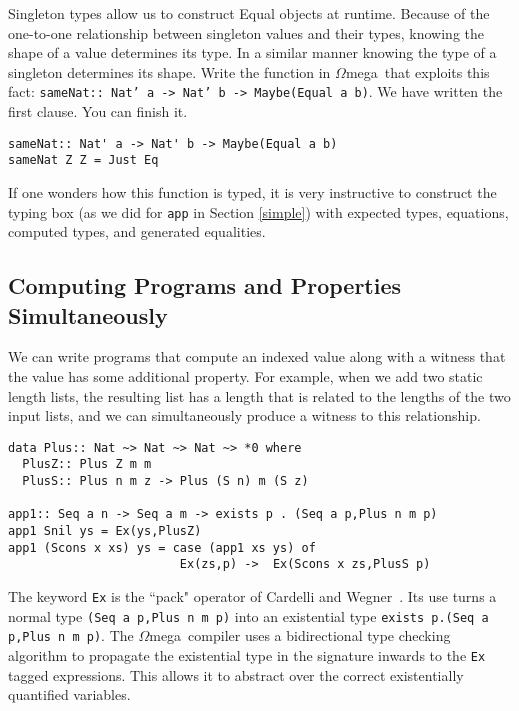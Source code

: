\documentclass[11pt,twoside,A4]{llncs}
\newcommand{\om}{\emph{$\Omega$}mega}
\begin{document}
\begin{exercise} \label{samenat}
Singleton types allow us to construct Equal objects at runtime.
Because of the one-to-one relationship between singleton values and their
types, knowing the shape of a value determines its type. In a similar
manner knowing the type of a singleton determines its shape. Write the
function in \om\ that exploits this fact: {\tt sameNat:: Nat' a -> Nat' b -> Maybe(Equal a b)}.
We have written the first clause. You can finish it.
\begin{verbatim}
sameNat:: Nat' a -> Nat' b -> Maybe(Equal a b)
sameNat Z Z = Just Eq
\end{verbatim}
If one wonders how this function is typed,
it is very instructive to construct the typing box (as we did for
{\tt app} in Section \ref{simple}) with expected types, equations,
computed types, and generated equalities.
\end{exercise}

\subsection{Computing Programs and Properties Simultaneously} We can write
programs that compute an indexed value along with a witness that the
value has some additional property. For example, when we add two
static length lists, the resulting list has a length that is
related to the lengths of the two input lists, and we can
simultaneously produce a witness to this relationship.

{\small
\begin{verbatim}
data Plus:: Nat ~> Nat ~> Nat ~> *0 where
  PlusZ:: Plus Z m m
  PlusS:: Plus n m z -> Plus (S n) m (S z)

app1:: Seq a n -> Seq a m -> exists p . (Seq a p,Plus n m p)
app1 Snil ys = Ex(ys,PlusZ)
app1 (Scons x xs) ys = case (app1 xs ys) of  
                        Ex(zs,p) ->  Ex(Scons x zs,PlusS p) 
\end{verbatim}}\vspace*{-.05in}

\noindent The keyword {\tt Ex} is the ``pack" operator of Cardelli and
Wegner~\cite{Cardelli-Wegner85}. Its use turns a normal type 
{\small \verb+(Seq a p,Plus n m p)+} into an existential type 
{\small \verb+exists p.(Seq a p,Plus n m p)+}. The \om\ compiler
uses a bidirectional type checking algorithm to propagate
the existential type in the signature inwards to the
{\tt Ex} tagged expressions. This allows it to
abstract over the correct existentially quantified variables.
\end{document}

